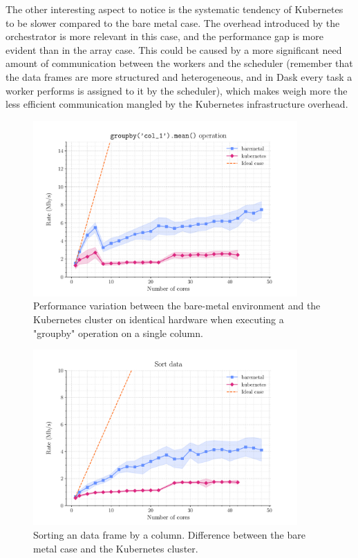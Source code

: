 The other interesting aspect to notice is the systematic tendency of Kubernetes
to be slower compared to the bare metal case.
The overhead introduced by the orchestrator is more relevant in this case, and
the performance gap is more evident than in the array case.
This could be caused by a more significant need amount of communication between
the workers and the scheduler (remember that the data frames are more structured
and heterogeneous, and in Dask every task a worker performs is assigned to it by
the scheduler), which makes weigh more the less efficient communication mangled
by the Kubernetes infrastructure overhead.

\begin{figure}
  \centering
  \includegraphics[width=0.9\textwidth]{img/chpt4/df-group-by-operation}
  \caption{Performance variation between the bare-metal environment and the
    Kubernetes cluster on identical hardware when executing a "groupby"
    operation on a single column.}
  \label{fig:dataframe-reduction-std}
\end{figure}

\begin{figure}
  \centering
  \includegraphics[width=0.9\textwidth]{img/chpt4/df-order-data}
  \caption{Sorting an data frame by a column. Difference between the bare metal
    case and the Kubernetes cluster.}
  \label{fig:dataframe-sort}
\end{figure}


